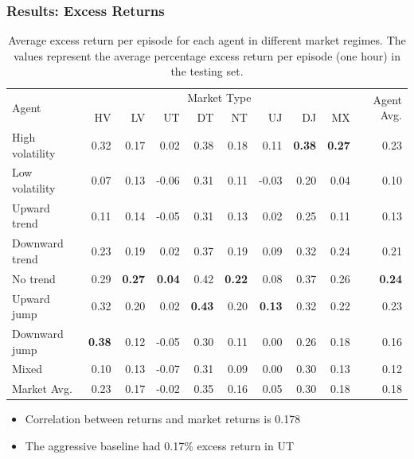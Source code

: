 \documentclass{beamer}
\begin{document}
\begin{frame}
  \frametitle{Results: Excess Returns}

  \begin{table}[htbp]
    \fontsize{7}{9}\selectfont
    \centering
    \caption{Average excess return per episode for each agent in different market regimes. The values represent the average percentage excess return per episode (one hour) in the testing set.}
    \begin{tabular}{l|rrrrrrrr|r}
    \hline
    \multirow{2}{*}{Agent} & \multicolumn{8}{c|}{Market Type} & \multirow{2}{*}{Agent Avg.} \\
    \cline{2-9}
    & HV &  LV &  UT &  DT &  NT &  UJ &  DJ & MX \\
    \hline
    High volatility &      0.32 &     0.17 &      0.02 &        0.38 &      0.18 &     0.11 &       \textbf{0.38} &   \textbf{0.27} &        0.23 \\
    Low volatility  &      0.07 &     0.13 &     -0.06 &        0.31 &      0.11 &    -0.03 &       0.20 &   0.04 &        0.10 \\
    Upward trend    &      0.11 &     0.14 &     -0.05 &        0.31 &      0.13 &     0.02 &       0.25 &   0.11 &        0.13 \\
    Downward trend  &      0.23 &     0.19 &      0.02 &        0.37 &      0.19 &     0.09 &       0.32 &   0.24 &        0.21 \\
    No trend        &      0.29 &     \textbf{0.27} &      \textbf{0.04} &        0.42 &      \textbf{0.22} &     0.08 &       0.37 &   0.26 &        \textbf{0.24} \\
    Upward jump     &      0.32 &     0.20 &      0.02 &        \textbf{0.43} &      0.20 &     \textbf{0.13} &       0.32 &   0.22 &        0.23 \\
    Downward jump   &      \textbf{0.38} &     0.12 &     -0.05 &        0.30 &      0.11 &     0.00 &       0.26 &   0.18 &        0.16 \\
    Mixed           &      0.10 &     0.13 &     -0.07 &        0.31 &      0.09 &     0.00 &       0.30 &   0.13 &        0.12 \\
    \hline
    Market Avg.     &      0.23 &     0.17 &     -0.02 &        0.35 &      0.16 &     0.05 &       0.30 &   0.18 &        0.18 \\
    \end{tabular}
  \end{table}

  \begin{itemize}
    \item Correlation between returns and market returns is 0.178
    \item The aggressive baseline had 0.17\% excess return in UT
  \end{itemize}
  
\end{frame}
\end{document}
